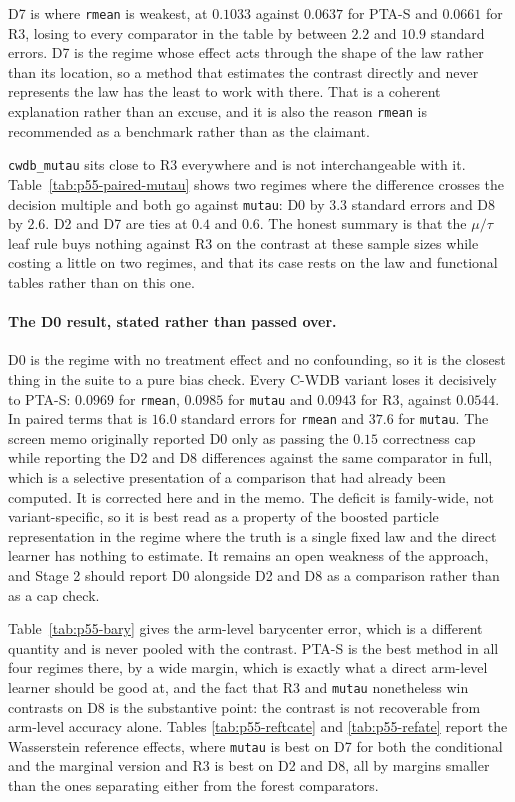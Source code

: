 D7 is where \texttt{rmean} is weakest, at $0.1033$ against $0.0637$ for PTA-S
and $0.0661$ for R3, losing to every comparator in the table by between $2.2$
and $10.9$ standard errors. D7 is the regime whose effect acts through the shape
of the law rather than its location, so a method that estimates the contrast
directly and never represents the law has the least to work with there. That is
a coherent explanation rather than an excuse, and it is also the reason
\texttt{rmean} is recommended as a benchmark rather than as the claimant.

\texttt{cwdb\_mutau} sits close to R3 everywhere and is not interchangeable with
it. Table~\ref{tab:p55-paired-mutau} shows two regimes where the difference
crosses the decision multiple and both go against \texttt{mutau}: D0 by $3.3$
standard errors and D8 by $2.6$. D2 and D7 are ties at $0.4$ and $0.6$. The
honest summary is that the $\mu/\tau$ leaf rule buys nothing against R3 on the
contrast at these sample sizes while costing a little on two regimes, and that
its case rests on the law and functional tables rather than on this one.

\paragraph{The D0 result, stated rather than passed over.} D0 is the regime with
no treatment effect and no confounding, so it is the closest thing in the suite
to a pure bias check. Every C-WDB variant loses it decisively to PTA-S:
$0.0969$ for \texttt{rmean}, $0.0985$ for \texttt{mutau} and $0.0943$ for R3,
against $0.0544$. In paired terms that is $16.0$ standard errors for
\texttt{rmean} and $37.6$ for \texttt{mutau}. The screen memo originally
reported D0 only as passing the $0.15$ correctness cap while reporting the D2
and D8 differences against the same comparator in full, which is a selective
presentation of a comparison that had already been computed. It is corrected
here and in the memo. The deficit is family-wide, not variant-specific, so it is
best read as a property of the boosted particle representation in the regime
where the truth is a single fixed law and the direct learner has nothing to
estimate. It remains an open weakness of the approach, and Stage 2 should report
D0 alongside D2 and D8 as a comparison rather than as a cap check.

Table~\ref{tab:p55-bary} gives the arm-level barycenter error, which is a
different quantity and is never pooled with the contrast. PTA-S is the best
method in all four regimes there, by a wide margin, which is exactly what a
direct arm-level learner should be good at, and the fact that R3 and
\texttt{mutau} nonetheless win contrasts on D8 is the substantive point: the
contrast is not recoverable from arm-level accuracy alone. Tables
\ref{tab:p55-reftcate} and \ref{tab:p55-refate} report the Wasserstein
reference effects, where \texttt{mutau} is best on D7 for both the conditional
and the marginal version and R3 is best on D2 and D8, all by margins smaller
than the ones separating either from the forest comparators.

